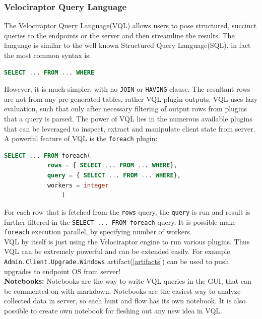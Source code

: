 \documentclass[a4paper, 11pt, oneside]{article} %
\begin{document}
\subsubsection{Velociraptor Query Language}\label{vql}
The Velociraptor Query Language(VQL) allows users to pose structured, succinct queries to the endpoints or the server and then streamline the results. The language is similar to the well known Structured Query Language(SQL), in fact the most common syntax is:
\begin{lstlisting}[basicstyle=\ttfamily, breaklines=true, language=SQL]
        SELECT ... FROM ... WHERE
\end{lstlisting}
However, it is much simpler, with no \verb|JOIN| or \verb|HAVING| clause. The resultant rows are not from any pre-generated tables, rather VQL plugin outputs. VQL uses lazy evaluation, such that only after necessary filtering of output rows from plugins that a query is parsed. The power of VQL lies in the numerous available plugins that can be leveraged to inspect, extract and manipulate client state from server.
\\
A powerful feature of VQL is the \verb|foreach| plugin:
\begin{lstlisting}[basicstyle=\ttfamily, breaklines=true, language=SQL]
        SELECT ... FROM foreach( 
            rows = { SELECT ... FROM ... WHERE},
            query = { SELECT ... FROM ... WHERE},
            workers = integer
                )
\end{lstlisting}
For each row that is fetched from the \verb|rows| query, the \verb|query| is run and result is further filtered in the \verb|SELECT ... FROM foreach| query. It is possible make \verb|foreach| execution parallel, by specifying number of workers.
\\
VQL by itself is just using the Velociraptor engine to run various plugins. Thus VQL can be extremely powerful and can be extended easily. For example \verb|Admin.Client.Upgrade.Windows| artifact(\ref{artifacts}) can be used to push upgrades to endpoint OS from server!
\\
\textbf{Notebooks:}\label{notebooks} Notebooks are the way to write VQL queries in the GUI, that can be commented on with markdown. Notebooks are the easiest way to analyze collected data in server, so each hunt and flow has its own notebook. It is also possible to create own notebook for fleshing out any new idea in VQL.
\end{document}
